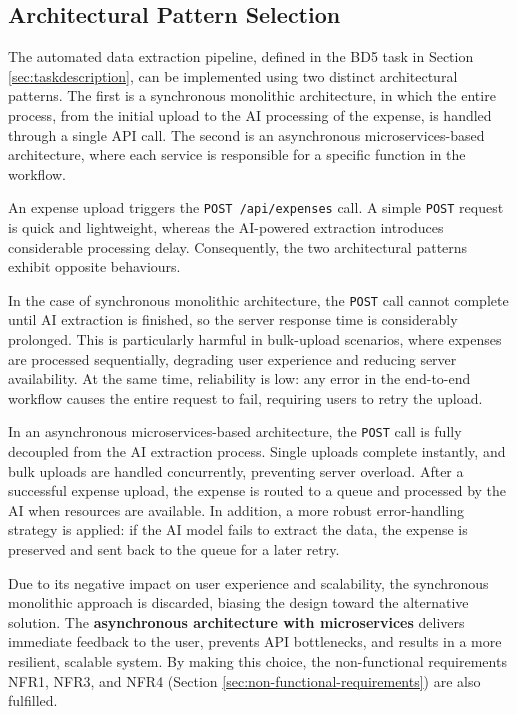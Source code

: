 
\vspace{0.2cm}

\subsection{Architectural Pattern Selection}

The automated data extraction pipeline, defined in the BD5 task in Section \ref{sec:taskdescription}, can be implemented using two distinct architectural patterns. The first is a synchronous monolithic architecture, in which the entire process, from the initial upload to the AI processing of the expense, is handled through a single API call. The second is an asynchronous microservices-based architecture, where each service is responsible for a specific function in the workflow.

An expense upload triggers the \texttt{POST /api/expenses} call. A simple \texttt{POST} request is quick and lightweight, whereas the AI-powered extraction introduces considerable processing delay. Consequently, the two architectural patterns exhibit opposite behaviours.

In the case of synchronous monolithic architecture, the \texttt{POST} call cannot complete until AI extraction is finished, so the server response time is considerably prolonged. This is particularly harmful in bulk-upload scenarios, where expenses are processed sequentially, degrading user experience and reducing server availability. At the same time, reliability is low: any error in the end-to-end workflow causes the entire request to fail, requiring users to retry the upload.

In an asynchronous microservices-based architecture, the \texttt{POST} call is fully decoupled from the AI extraction process. Single uploads complete instantly, and bulk uploads are handled concurrently, preventing server overload. After a successful expense upload, the expense is routed to a queue and processed by the AI when resources are available. In addition, a more robust error-handling strategy is applied: if the AI model fails to extract the data, the expense is preserved and sent back to the queue for a later retry.

Due to its negative impact on user experience and scalability, the synchronous monolithic approach is discarded, biasing the design toward the alternative solution. The \textbf{asynchronous architecture with microservices} delivers immediate feedback to the user, prevents API bottlenecks, and results in a more resilient, scalable system. By making this choice, the non-functional requirements NFR1, NFR3, and NFR4 (Section \ref{sec:non-functional-requirements}) are also fulfilled.
